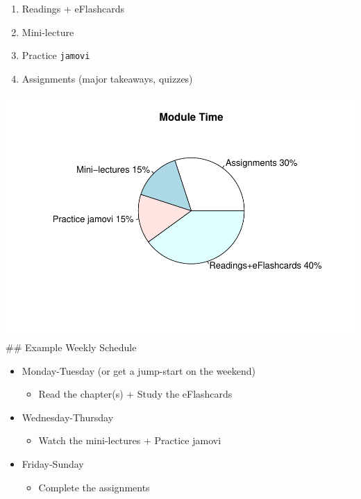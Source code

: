 \documentclass[11pt,]{article}
\makeatletter
\providecommand{\tightlist}{%
  \setlength{\itemsep}{0pt}\setlength{\parskip}{0pt}}
\def\maxwidth{\ifdim\Gin@nat@width>\linewidth\linewidth
\else\Gin@nat@width\fi}
\let\Oldincludegraphics\includegraphics
\renewcommand{\includegraphics}[1]{\Oldincludegraphics[width=\maxwidth]{#1}}
\makeatother
\begin{document}
\begin{enumerate}
\def\labelenumi{\arabic{enumi}.}
\tightlist
\item
  Readings + eFlashcards
\item
  Mini-lecture
\item
  Practice \texttt{jamovi}
\item
  Assignments (major takeaways, quizzes)
\end{enumerate}

\includegraphics{KIN610-SP22_files/figure-latex/unnamed-chunk-1-1.pdf}
\#\# Example Weekly Schedule

\begin{itemize}
\tightlist
\item
  Monday-Tuesday (or get a jump-start on the weekend)

  \begin{itemize}
  \tightlist
  \item
    Read the chapter(s) + Study the eFlashcards
  \end{itemize}
\item
  Wednesday-Thursday

  \begin{itemize}
  \tightlist
  \item
    Watch the mini-lectures + Practice jamovi
  \end{itemize}
\item
  Friday-Sunday

  \begin{itemize}
  \tightlist
  \item
    Complete the assignments
  \end{itemize}
\end{itemize}
\end{document}
